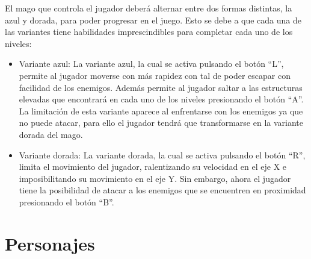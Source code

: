 El mago que controla el jugador deberá alternar entre dos formas distintas, la azul y dorada, para poder progresar en el juego. Esto se debe a que cada una de las variantes tiene habilidades imprescindibles para completar cada uno de los niveles:

\begin{itemize}
	\item Variante azul: La variante azul, la cual se activa pulsando el botón ``L'', permite al jugador moverse con más rapidez con tal de poder escapar con facilidad de los enemigos. Además permite al jugador saltar a las estructuras elevadas que encontrará en cada uno de los niveles presionando el botón ``A''. La limitación de esta variante aparece al enfrentarse con los enemigos ya que no puede atacar, para ello el jugador tendrá que transformarse en la variante dorada del mago.
	\item Variante dorada: La variante dorada, la cual se activa pulsando el botón ``R'', limita el movimiento del jugador, ralentizando su velocidad en el eje X e imposibilitando su movimiento en el eje Y. Sin embargo, ahora el jugador tiene la posibilidad de atacar a los enemigos que se encuentren en proximidad presionando el botón ``B''.
\end{itemize}

\section{Personajes}

